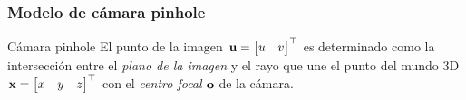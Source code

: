 \documentclass[compress]{beamer}
\begin{document}
\begin{frame}
\frametitle{Modelo de cámara pinhole}



\begin{block}{Cámara pinhole}
El punto de la imagen $\boldsymbol{\mathbf{u}}=\begin{bmatrix}u & v\end{bmatrix}^{\top}$ es determinado como la intersección entre el \emph{plano de la imagen} y el rayo que une el punto del mundo 3D $\boldsymbol{\mathbf{x}}=\begin{bmatrix}x & y & z\end{bmatrix}^{\top}$ con el \emph{centro focal} $\boldsymbol{\mathbf{o}}$ de la cámara.
\end{block}

\begin{figure}[!htb]
	\centering
	\hfill
\end{figure}

\end{frame}
\end{document}
